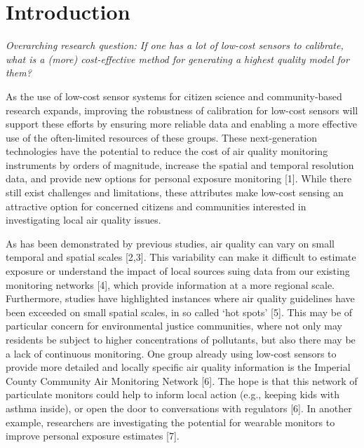 \documentclass[journal abbreviation, manuscript]{copernicus}
\begin{document}
\section{Introduction}

\emph{Overarching research question: If one has a lot of low-cost sensors to calibrate, what is a (more) cost-effective method for generating a highest quality model for them?}

As the use of low-cost sensor systems for citizen science and community-based research expands, improving the robustness of calibration for low-cost sensors will support these efforts by ensuring more reliable data and enabling a more effective use of the often-limited resources of these groups. These next-generation technologies have the potential to reduce the cost of air quality monitoring instruments by orders of magnitude, increase the spatial and temporal resolution data, and provide new options for personal exposure monitoring [1].  While there still exist challenges and limitations, these attributes make low-cost sensing an attractive option for concerned citizens and communities interested in investigating local air quality issues. 

As has been demonstrated by previous studies, air quality can vary on small temporal and spatial scales [2,3]. This variability can make it difficult to estimate exposure or understand the impact of local sources suing data from our existing monitoring networks [4], which provide information at a more regional scale. Furthermore, studies have highlighted instances where air quality guidelines have been exceeded on small spatial scales, in so called ‘hot spots’ [5]. This may be of particular concern for environmental justice communities, where not only may residents be subject to higher concentrations of pollutants, but also there may be a lack of continuous monitoring. One group already using low-cost sensors to provide more detailed and locally specific air quality information is the Imperial County Community Air Monitoring Network [6]. The hope is that this network of particulate monitors could help to inform local action (e.g., keeping kids with asthma inside), or open the door to conversations with regulators [6]. In another example, researchers are investigating the potential for wearable monitors to improve personal exposure estimates [7]. 
\end{document}
